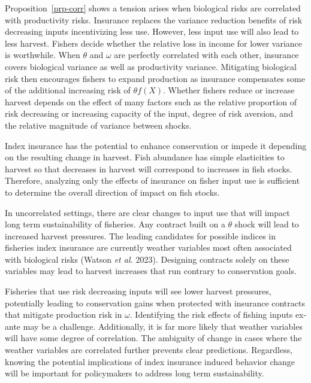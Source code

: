 \documentclass[
  letterpaper,
  DIV=11,
  numbers=noendperiod]{scrartcl}
\theoremstyle{plain}
\theoremstyle{plain}
\theoremstyle{remark}
\begin{document}
Proposition~\ref{prp-corr} shows a tension arises when biological risks
are correlated with productivity risks. Insurance replaces the variance
reduction benefits of risk decreasing inputs incentivizing less use.
However, less input use will also lead to less harvest. Fishers decide
whether the relative loss in income for lower variance is worthwhile.
When \(\theta\) and \(\omega\) are perfectly correlated with each other,
insurance covers biological variance as well as productivity variance.
Mitigating biological risk then encourages fishers to expand production
as insurance compensates some of the additional increasing risk of
\(\theta f(X)\). Whether fishers reduce or increase harvest depends on
the effect of many factors such as the relative proportion of risk
decreasing or increasing capacity of the input, degree of risk aversion,
and the relative magnitude of variance between shocks.

Index insurance has the potential to enhance conservation or impede it
depending on the resulting change in harvest. Fish abundance has simple
elasticities to harvest so that decreases in harvest will correspond to
increases in fish stocks. Therefore, analyzing only the effects of
insurance on fisher input use is sufficient to determine the overall
direction of impact on fish stocks.

In uncorrelated settings, there are clear changes to input use that will
impact long term sustainability of fisheries. Any contract built on a
\(\theta\) shock will lead to increased harvest pressures. The leading
candidates for possible indices in fisheries index insurance are
currently weather variables most often associated with biological risks
(Watson \emph{et al.} 2023). Designing contracts solely on these
variables may lead to harvest increases that run contrary to
conservation goals.

Fisheries that use risk decreasing inputs will see lower harvest
pressures, potentially leading to conservation gains when protected with
insurance contracts that mitigate production risk in \(\omega\).
Identifying the risk effects of fishing inputs ex-ante may be a
challenge. Additionally, it is far more likely that weather variables
will have some degree of correlation. The ambiguity of change in cases
where the weather variables are correlated further prevents clear
predictions. Regardless, knowing the potential implications of index
insurance induced behavior change will be important for policymakers to
address long term sustainability.
\end{document}
